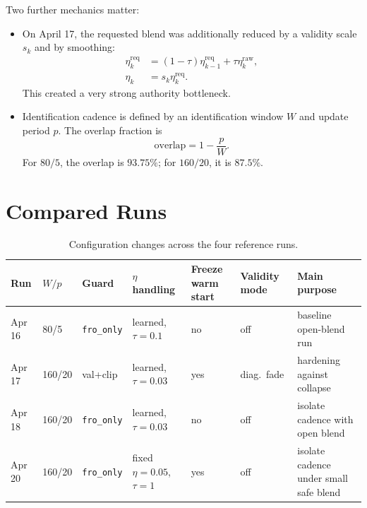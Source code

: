 \documentclass[11pt]{article}
\begin{document}
Two further mechanics matter:
\begin{itemize}
\item On April 17, the requested blend was additionally reduced by a validity scale $s_k$ and by smoothing:
\begin{align}
\eta_k^{\mathrm{req}} &= (1-\tau)\eta_{k-1}^{\mathrm{req}} + \tau \eta_k^{\mathrm{raw}}, \\
\eta_k &= s_k \eta_k^{\mathrm{req}}.
\end{align}
This created a very strong authority bottleneck.
\item Identification cadence is defined by an identification window $W$ and update period $p$. The overlap fraction is
\begin{equation}
\mathrm{overlap} = 1 - \frac{p}{W}.
\end{equation}
For $80/5$, the overlap is $93.75\%$; for $160/20$, it is $87.5\%$.
\end{itemize}

\section*{Compared Runs}
\begin{table}[htbp]
\centering
\small
\begin{tabular}{|m{1.8cm}|m{1.2cm}|m{1.6cm}|m{1.7cm}|m{1.2cm}|m{1.4cm}|m{2.4cm}|}
\hline
Run & $W/p$ & Guard & $\eta$ handling & Freeze warm start & Validity mode & Main purpose \\
\hline
Apr 16 & 80/5 & \texttt{fro\_only} & learned, $\tau=0.1$ & no & off & baseline open-blend run \\
\hline
Apr 17 & 160/20 & val+clip & learned, $\tau=0.03$ & yes & diag.\ fade & hardening against collapse \\
\hline
Apr 18 & 160/20 & \texttt{fro\_only} & learned, $\tau=0.03$ & no & off & isolate cadence with open blend \\
\hline
Apr 20 & 160/20 & \texttt{fro\_only} & fixed $\eta=0.05$, $\tau=1$ & yes & off & isolate cadence under small safe blend \\
\hline
\end{tabular}
\caption{Configuration changes across the four reference runs.}
\end{table}
\end{document}
